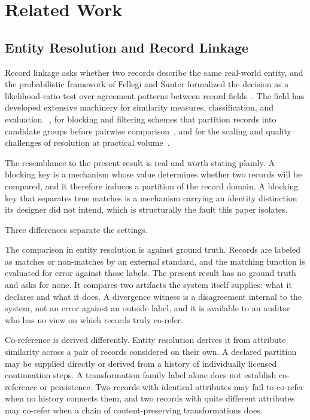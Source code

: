 \documentclass[11pt]{article}
\theoremstyle{plain}
\theoremstyle{definition}
\theoremstyle{remark}
\begin{document}
\section{Related Work}
\label{oi.sec.related}

\subsection{Entity Resolution and Record Linkage}

Record linkage asks whether two records describe the same real-world entity,
and the probabilistic framework of Fellegi and Sunter
formalized the decision as a likelihood-ratio test
over agreement patterns between record fields~\citep{fellegisunter1969}.
The field has developed extensive machinery for
similarity measures, classification, and evaluation
~\citep{elmagarmid2007duplicate,christen2012datamatching},
for blocking and filtering schemes
that partition records into candidate groups
before pairwise comparison~\citep{papadakis2020blocking},
and for the scaling and quality challenges
of resolution at practical volume~\citep{getoor2012er}.

The resemblance to the present result is real and worth stating plainly.
A blocking key is a mechanism whose value determines
whether two records will be compared,
and it therefore induces a partition of the record domain.
A blocking key that separates true matches
is a mechanism carrying an identity distinction its designer did not intend,
which is structurally the fault this paper isolates.

Three differences separate the settings.

The comparison in entity resolution is against ground truth.
Records are labeled as matches or non-matches by an external standard,
and the matching function is evaluated for error against those labels.
The present result has no ground truth and asks for none.
It compares two artifacts the system itself supplies:
what it declares and what it does.
A divergence witness is a disagreement internal to the system,
not an error against an outside label,
and it is available to an auditor
who has no view on which records truly co-refer.

Co-reference is derived differently.
Entity resolution derives it from attribute similarity
across a pair of records considered on their own.
A declared partition may be supplied directly or derived
from a history of individually licensed continuation steps.
A transformation family label alone does not establish
co-reference or persistence.
Two records with identical attributes may fail to co-refer
when no history connects them,
and two records with quite different attributes may co-refer
when a chain of content-preserving transformations does.
\end{document}
